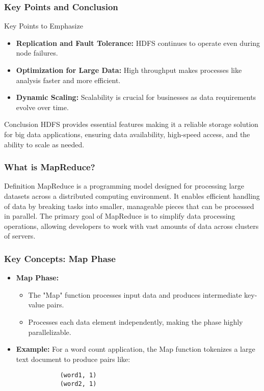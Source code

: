 \documentclass[aspectratio=169]{beamer}
\begin{document}
\begin{frame}[fragile]
    \frametitle{Key Points and Conclusion}
    \begin{block}{Key Points to Emphasize}
        \begin{itemize}
            \item \textbf{Replication and Fault Tolerance:} HDFS continues to operate even during node failures.
            \item \textbf{Optimization for Large Data:} High throughput makes processes like analysis faster and more efficient.
            \item \textbf{Dynamic Scaling:} Scalability is crucial for businesses as data requirements evolve over time.
        \end{itemize}
    \end{block}
    
    \begin{block}{Conclusion}
        HDFS provides essential features making it a reliable storage solution for big data applications, ensuring data availability, high-speed access, and the ability to scale as needed.
    \end{block}
\end{frame}

\begin{frame}[fragile]
    \frametitle{What is MapReduce?}
    \begin{block}{Definition}
        MapReduce is a programming model designed for processing large datasets across a distributed computing environment. It enables efficient handling of data by breaking tasks into smaller, manageable pieces that can be processed in parallel. The primary goal of MapReduce is to simplify data processing operations, allowing developers to work with vast amounts of data across clusters of servers.
    \end{block}
\end{frame}

\begin{frame}[fragile]
    \frametitle{Key Concepts: Map Phase}
    \begin{itemize}
        \item \textbf{Map Phase:} 
        \begin{itemize}
            \item The "Map" function processes input data and produces intermediate key-value pairs.
            \item Processes each data element independently, making the phase highly parallelizable.
        \end{itemize}
        \item \textbf{Example:} For a word count application, the Map function tokenizes a large text document to produce pairs like:
        \begin{lstlisting}
            (word1, 1)
            (word2, 1)
        \end{lstlisting}
    \end{itemize}
\end{frame}
\end{document}
